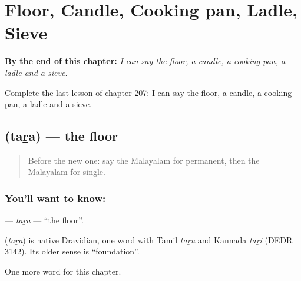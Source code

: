 
\chapter{Floor, Candle, Cooking pan, Ladle, Sieve}
\label{ch:ml-floor-candle-cooking-pan-ladle-sieve}

\begin{chapteropening}
\textbf{By the end of this chapter:} \emph{I can say the floor, a candle, a cooking pan, a ladle and a sieve.}

Complete the last lesson of chapter 207: I can say the floor, a candle, a cooking pan, a ladle and a sieve.
\end{chapteropening}

\section[\texorpdfstring{\ml{തറ} (taṟa)}{തറ (taṟa)}]{ (taṟa) — the floor}

\label{lesson:ML-C207-tara}



\begin{quote}
Before the new one: say the Malayalam for permanent, then the Malayalam for single.
\end{quote}

\subsection*{You'll want to know: }
\textbf{} — \emph{taṟa} — \textquotedblleft{}the floor\textquotedblright{}.

\begin{cousinweb}
\textbf{} (\emph{taṟa}) is native Dravidian, one word with Tamil \emph{taṟu} and Kannada \emph{taṟi} (DEDR 3142). Its older sense is \textquotedblleft{}foundation\textquotedblright{}.
\end{cousinweb}

\begin{grammarlens}[title={What you've built}]
One more word for this chapter.
\end{grammarlens}

